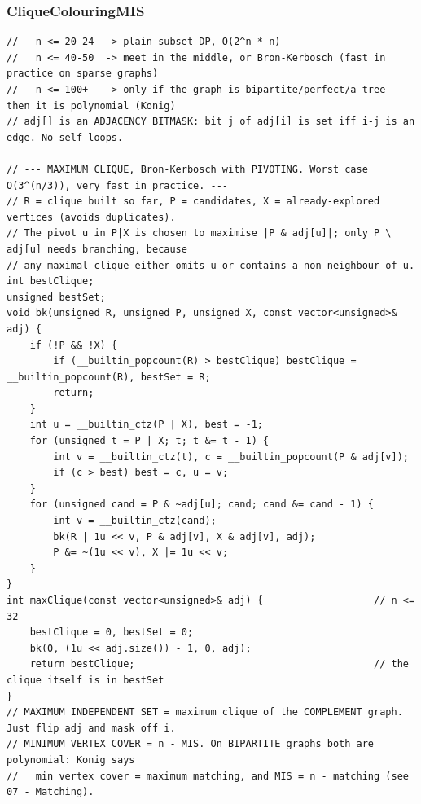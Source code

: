 \documentclass[9pt,a4paper,twocolumn]{extarticle}
\begin{document}
\subsubsection{CliqueColouringMIS}
\nopagebreak
\begin{lstlisting}
//   n <= 20-24  -> plain subset DP, O(2^n * n)
//   n <= 40-50  -> meet in the middle, or Bron-Kerbosch (fast in practice on sparse graphs)
//   n <= 100+   -> only if the graph is bipartite/perfect/a tree - then it is polynomial (Konig)
// adj[] is an ADJACENCY BITMASK: bit j of adj[i] is set iff i-j is an edge. No self loops.

// --- MAXIMUM CLIQUE, Bron-Kerbosch with PIVOTING. Worst case O(3^(n/3)), very fast in practice. ---
// R = clique built so far, P = candidates, X = already-explored vertices (avoids duplicates).
// The pivot u in P|X is chosen to maximise |P & adj[u]|; only P \ adj[u] needs branching, because
// any maximal clique either omits u or contains a non-neighbour of u.
int bestClique;
unsigned bestSet;
void bk(unsigned R, unsigned P, unsigned X, const vector<unsigned>& adj) {
    if (!P && !X) {
        if (__builtin_popcount(R) > bestClique) bestClique = __builtin_popcount(R), bestSet = R;
        return;
    }
    int u = __builtin_ctz(P | X), best = -1;
    for (unsigned t = P | X; t; t &= t - 1) {
        int v = __builtin_ctz(t), c = __builtin_popcount(P & adj[v]);
        if (c > best) best = c, u = v;
    }
    for (unsigned cand = P & ~adj[u]; cand; cand &= cand - 1) {
        int v = __builtin_ctz(cand);
        bk(R | 1u << v, P & adj[v], X & adj[v], adj);
        P &= ~(1u << v), X |= 1u << v;
    }
}
int maxClique(const vector<unsigned>& adj) {                   // n <= 32
    bestClique = 0, bestSet = 0;
    bk(0, (1u << adj.size()) - 1, 0, adj);
    return bestClique;                                         // the clique itself is in bestSet
}
// MAXIMUM INDEPENDENT SET = maximum clique of the COMPLEMENT graph. Just flip adj and mask off i.
// MINIMUM VERTEX COVER = n - MIS. On BIPARTITE graphs both are polynomial: Konig says
//   min vertex cover = maximum matching, and MIS = n - matching (see 07 - Matching).


\end{lstlisting}
\end{document}
